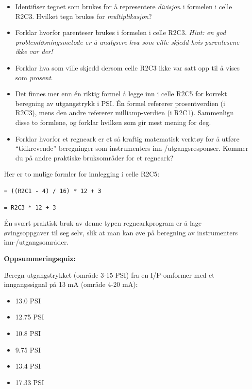\begin{itemize}
\item{} Identifiser tegnet som brukes for å representere {\it divisjon} i formelen i celle R2C3. Hvilket tegn brukes for {\it multiplikasjon}?
\item{} Forklar hvorfor parenteser brukes i formelen i celle R2C3. {\it Hint: en god problemløsningsmetode er å analysere hva som ville skjedd hvis parentesene ikke var der!}
\item{} Forklar hva som ville skjedd dersom celle R2C3 ikke var satt opp til å vises som {\it prosent}.
\item{} Det finnes mer enn én riktig formel å legge inn i celle R2C5 for korrekt beregning av utgangstrykk i PSI. Én formel refererer prosentverdien (i R2C3), mens den andre refererer milliamp-verdien (i R2C1). Sammenlign disse to formlene, og forklar hvilken som gir mest mening for deg.
\item{} Forklar hvorfor et regneark er et så kraftig matematisk verktøy for å utføre ``tidkrevende'' beregninger som instrumenters inn-/utgangsresponser. Kommer du på andre praktiske bruksområder for et regneark?
\end{itemize}







Her er to mulige formler for innlegging i celle R2C5:

\vskip 10pt

{\tt = ((R2C1 - 4) / 16) * 12 + 3}

\vskip 10pt

{\tt = R2C3 * 12 + 3}

\vskip 10pt

Én svært praktisk bruk av denne typen regnearkprogram er å lage øvingsoppgaver til seg selv, slik at man kan øve på beregning av instrumenters inn-/utgangsområder.







\vfil \eject

\noindent
{\bf Oppsummeringsquiz:}

Beregn utgangstrykket (område 3-15 PSI) fra en I/P-omformer med et inngangssignal på 13 mA (område 4-20 mA):

\begin{itemize}
\item{} 13.0 PSI
\vskip 5pt
\item{} 12.75 PSI
\vskip 5pt
\item{} 10.8 PSI
\vskip 5pt
\item{} 9.75 PSI
\vskip 5pt
\item{} 13.4 PSI
\vskip 5pt
\item{} 17.33 PSI
\end{itemize}


